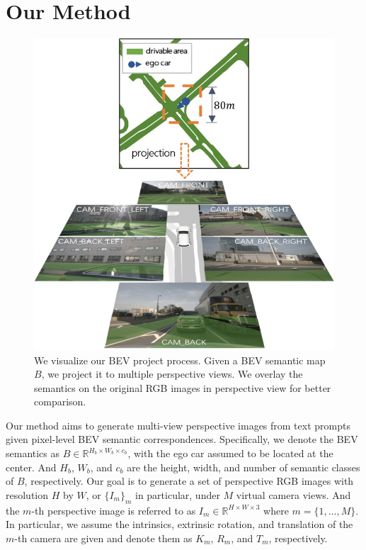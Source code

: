 \section{Our Method}
\label{sec:method}

\begin{figure}[b!]
\centering
\includegraphics[width=0.9\linewidth]{figures/bev_projection.jpg}
\caption{We visualize our BEV project process. Given a BEV semantic map $\textit{B}$, we project it to multiple perspective views. We overlay the semantics on the original RGB images in perspective view for better comparison.  
}
\label{fig:bev_proj}
\end{figure}

Our method aims to generate multi-view perspective images from text prompts given pixel-level BEV semantic correspondences. Specifically, we denote the BEV semantics as $\textit{B}\in\mathbb{R}^{H_b\times W_b\times c_b}$, with the ego car assumed to be located at the center. And $H_b$, $W_b$, and $c_b$ are the height, width, and number of semantic classes of $\textit{B}$, respectively. Our goal is to generate a set of perspective RGB images with resolution $H$ by $W$, or $\{I_m\}_m$ in particular, under $M$ virtual camera views. And the $m$-th perspective image is referred to as $I_m\in\mathbb{R}^{H\times W\times 3}$ where $m=\{1,\dots,M\}$. In particular, we assume the intrinsics, extrinsic rotation, and translation of the $m$-th camera are given and denote them as $K_m$, $R_m$, and $T_m$, respectively. 

